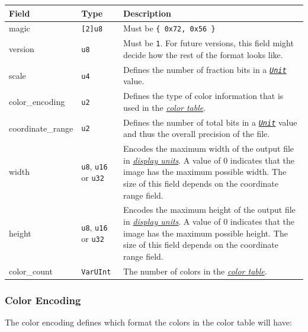 \documentclass[]{article}
\newcommand{\link}[2]{\hyperlink{#1}{\emph{#2}}}
\begin{document}
\begin{longtable}[]{@{}p{1in}p{1in}p{4in}@{}}
\toprule
Field & Type & Description \\
\midrule
\endhead
magic & \texttt{{[}2{]}u8} & Must be \texttt{\{\ 0x72,\ 0x56\ \}} \\
version & \texttt{u8} & Must be \texttt{1}. For future versions, this field might decide how the rest of the format looks like. \\
scale & \texttt{u4} & Defines the number of fraction bits in a \link{units}{\texttt{Unit}} value. \\
color\_encoding & \texttt{u2} & Defines the type of color information that is used in the \link{color-table}{color table}. \\
coordinate\_range & \texttt{u2} & Defines the number of total bits in a \link{units}{\texttt{Unit}} value and thus the overall precision of the file. \\
width & \texttt{u8}, \texttt{u16} or \texttt{u32} & Encodes the maximum width of the output file in \link{display-units}{display units}. A value of 0 indicates that the image has the maximum possible width. The size of this field depends on the coordinate range field. \\
height & \texttt{u8}, \texttt{u16} or \texttt{u32} & Encodes the maximum height of the output file in \link{display-units}{display units}. A value of 0 indicates that the image has the maximum possible height. The size of this field depends on the coordinate range field. \\
color\_count & \texttt{VarUInt} & The number of colors in the \link{color-table}{color table}. \\
\bottomrule
\end{longtable}

\hypertarget{color-encoding}{\subsubsection{Color Encoding}\label{color-encoding}}

The color encoding defines which format the colors in the color table
will have:
\end{document}
